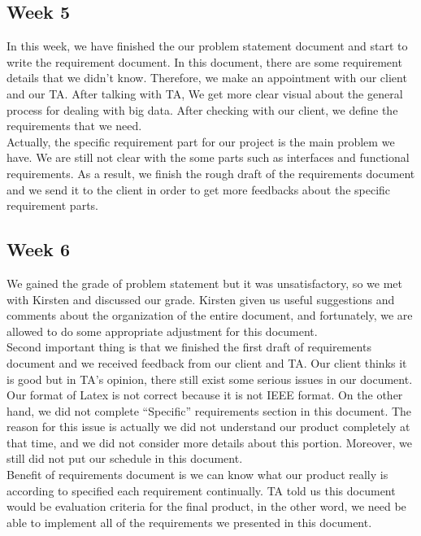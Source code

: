 \subsection{Week 5}

\noindent In this week, we have finished the our problem statement document and start to write the requirement document. In this document, there are some requirement details that we didn't know. Therefore, we make an appointment with our client and our TA.  After talking with TA, We get more clear visual about the general process for dealing with big data. After checking with our client, we define the requirements that we need. \\

\noindent Actually, the specific requirement part for our project is the main problem we have. We are still not clear with the some parts such as interfaces and functional requirements. As a result,  we finish the rough draft of the requirements document and we send it to the client in order to get more feedbacks about the specific requirement parts.

\subsection{Week 6}
We gained the grade of problem statement but it was unsatisfactory, so we met with Kirsten and discussed our grade. Kirsten given us useful suggestions and comments about the organization of the entire document, and fortunately, we are allowed to do some appropriate adjustment for this document.\\
 
\noindent Second important thing is that we finished the first draft of requirements document and we received feedback from our client and TA. Our client thinks it is good but in TA’s opinion, there still exist some serious issues in our document. Our format of Latex is not correct because it is not IEEE format. On the other hand, we did not complete “Specific” requirements section in this document. The reason for this issue is actually we did not understand our product completely at that time, and we did not consider more details about this portion. Moreover, we still did not put our schedule in this document. \\ 

\noindent Benefit of requirements document is we can know what our product really is according to specified each requirement continually.  TA told us this document would be evaluation criteria for the final product, in the other word, we need be able to implement all of the requirements we presented in this document.

